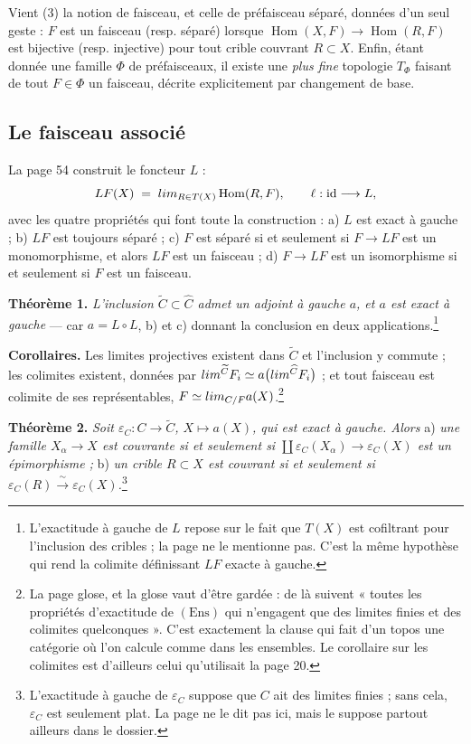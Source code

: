 \documentclass[11pt,a4paper]{article}
\begin{document}
Vient (3) la notion de faisceau, et celle de préfaisceau séparé, données d'un
seul geste : $F$ est un faisceau (resp. séparé) lorsque
$\operatorname{Hom}(X,F) \to \operatorname{Hom}(R,F)$ est bijective (resp.
injective) pour tout crible couvrant $R \subset X$. Enfin, étant donnée une
famille $\Phi$ de préfaisceaux, il existe une \emph{plus fine} topologie
$T_{\Phi}$ faisant de tout $F \in \Phi$ un faisceau, décrite explicitement par
changement de base.

\subsection*{Le faisceau associé}

La page 54 construit le foncteur $L$ :
\[
LF(X) \;=\; \varinjlim_{R \in T(X)} \operatorname{Hom}(R, F),
\qquad \ell : \mathrm{id} \longrightarrow L,
\]
avec les quatre propriétés qui font toute la construction : a) $L$ est exact à
gauche ; b) $LF$ est toujours séparé ; c) $F$ est séparé si et seulement si
$F \to LF$ est un monomorphisme, et alors $LF$ est un faisceau ; d) $F \to LF$
est un isomorphisme si et seulement si $F$ est un faisceau.

\textbf{Théorème 1.} \emph{L'inclusion $\widetilde{C} \subset \widehat{C}$
admet un adjoint à gauche $a$, et $a$ est exact à gauche} — car $a = L \circ L$,
b) et c) donnant la conclusion en deux applications.\footnote{L'exactitude à
gauche de $L$ repose sur le fait que $T(X)$ est cofiltrant pour l'inclusion des
cribles ; la page ne le mentionne pas. C'est la même hypothèse qui rend la
colimite définissant $LF$ exacte à gauche.}

\textbf{Corollaires.} Les limites projectives existent dans $\widetilde{C}$ et
l'inclusion y commute ; les colimites existent, données par
$\varinjlim^{\widetilde{C}} F_{i} \simeq a\bigl(\varinjlim^{\widehat{C}}
F_{i}\bigr)$ ; et tout faisceau est colimite de ses représentables,
$F \simeq \varinjlim_{C/F} a(X)$.\footnote{La page glose, et la glose vaut
d'être gardée : de là suivent « toutes les propriétés d'exactitude de
$(\mathrm{Ens})$ qui n'engagent que des limites finies et des colimites
quelconques ». C'est exactement la clause qui fait d'un topos une catégorie où
l'on calcule comme dans les ensembles. Le corollaire sur les colimites est
d'ailleurs celui qu'utilisait la page 20.}

\textbf{Théorème 2.} \emph{Soit $\varepsilon_{C} : C \to \widetilde{C}$,
$X \mapsto a(X)$, qui est exact à gauche. Alors} a) \emph{une famille
$X_{\alpha} \to X$ est couvrante si et seulement si
$\coprod \varepsilon_{C}(X_{\alpha}) \to \varepsilon_{C}(X)$ est un
épimorphisme ;} b) \emph{un crible $R \subset X$ est couvrant si et seulement
si $\varepsilon_{C}(R) \xrightarrow{\ \sim\ } \varepsilon_{C}(X)$.}\footnote{L'exactitude
à gauche de $\varepsilon_{C}$ suppose que $C$ ait des limites finies ; sans
cela, $\varepsilon_{C}$ est seulement plat. La page ne le dit pas ici, mais le
suppose partout ailleurs dans le dossier.}
\end{document}
